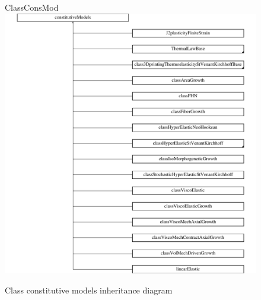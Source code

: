 \documentclass[oneside,11pt,times]{book}
\begin{document}
\begin{figure}[htb]
   ClassConsMod \centering
    \includegraphics[scale=0.5]{imgs/UserManual/classconstitutiveModels.pdf}
    \caption{Class constitutive models inheritance diagram}
    \label{fig:}
\end{figure}
\end{document}
